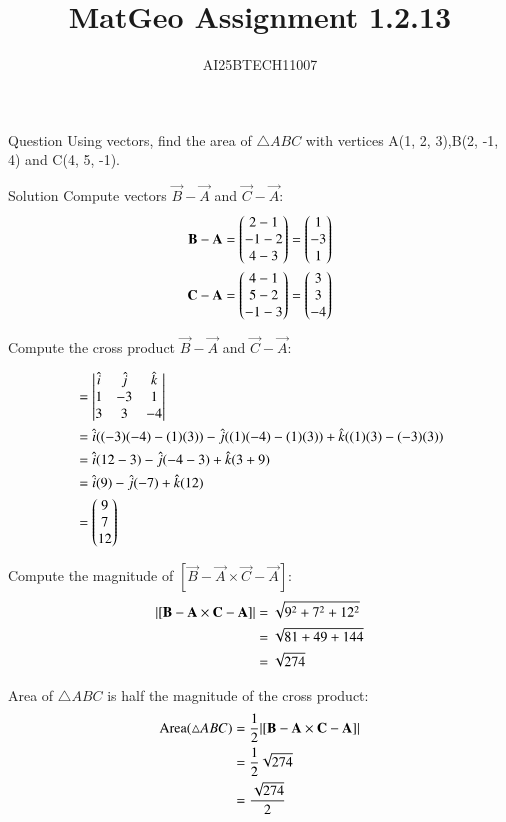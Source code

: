 \documentclass{beamer}
\title 
{MatGeo Assignment 1.2.13}
\author
{AI25BTECH11007}
\begin{document}
\frame{\titlepage}
\begin{frame}{Question}
Using vectors, find the area of $\triangle ABC$ with vertices A(1, 2, 3),B(2, -1, 4) and C(4, 5, -1).
\end{frame}
\begin{frame}{Solution}
Compute vectors $\vec{B}-\vec{A}$ and $\vec{C}-\vec{A}$:
\begin{align}
 \vec{B} - \vec{A} = \myvec{2-1 \\ -1-2 \\ 4-3} = \myvec{1 \\ -3 \\ 1} \label{eq:1} \\
 \vec{C} - \vec{A} = \myvec{4-1 \\ 5-2 \\ -1-3} = \myvec{3 \\ 3 \\ -4} \label{eq:2}
\end{align}

 Compute the cross product $\vec{B}-\vec{A}$ and $\vec{C}-\vec{A}$:
  \end{frame}
 \begin{frame}
\begin{align}
[\vec{B}-\vec{A} \times \vec{C}-\vec{A}] &=
\begin{vmatrix}
\hat{i} & \hat{j} & \hat{k} \\
1 & -3 & 1 \\
3 & 3 & -4
\end{vmatrix} \notag \\
&= \hat{i}((-3)(-4) - (1)(3)) - \hat{j}((1)(-4) - (1)(3)) + \hat{k}((1)(3) - (-3)(3)) \notag \\
&= \hat{i}(12-3) - \hat{j}(-4-3) + \hat{k}(3+9) \notag \\
&= \hat{i}(9) - \hat{j}(-7) + \hat{k}(12) \notag \\
&= \myvec{9 \\ 7 \\ 12} \label{eq:3}
\end{align}

Compute the magnitude of $[\vec{B}-\vec{A} \times \vec{C}-\vec{A}]$:
\begin{align}
|[\vec{B}-\vec{A} \times \vec{C}-\vec{A}]| &= \sqrt{9^2 + 7^2 + 12^2} \notag \\
&= \sqrt{81 + 49 + 144} \notag \\
&= \sqrt{274} \label{eq:4}
\end{align}
\end{frame}
\begin{frame}
 Area of $\triangle ABC$ is half the magnitude of the cross product:
\begin{align}
\text{Area}(\triangle ABC) &= \frac{1}{2} |[\vec{B}-\vec{A} \times \vec{C}-\vec{A}]| \notag \\
&= \frac{1}{2} \sqrt{274} \notag \\
&= \frac{\sqrt{274}}{2} \label{eq:5}
\end{align}
\end{frame}
\end{document}

